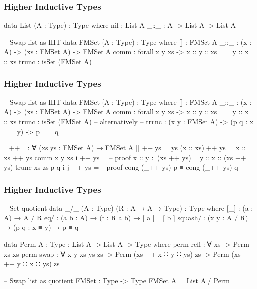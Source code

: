 \documentclass{beamer}
\begin{document}
\begin{frame}[fragile]
\frametitle{Higher Inductive Types}

\begin{code}
data List (A : Type) : Type where
  nil : List A
  _::_ : A -> List A -> List A

-- Swap list as HIT
data FMSet (A : Type) : Type where
  []    : FMSet A
  _::_  : (x : A) -> (xs : FMSet A) -> FMSet A
  comm  : forall x y xs -> x :: y :: xs == y :: x :: xs
  trunc : isSet (FMSet A)
\end{code}

\end{frame}

\begin{frame}[fragile]
\frametitle{Higher Inductive Types}

\begin{code}
-- Swap list as HIT
data FMSet (A : Type) : Type where
  []    : FMSet A
  _::_  : (x : A) -> (xs : FMSet A) -> FMSet A
  comm  : forall x y xs -> x :: y :: xs == y :: x :: xs
  trunc : isSet (FMSet A)
  -- alternatively
  -- trunc : (x y : FMSet A) -> (p q : x == y) -> p == q

_++_ : ∀ (xs ys : FMSet A) → FMSet A
[] ++ ys = ys
(x :: xs) ++ ys = x :: xs ++ ys
comm x y xs i ++ ys =
  -- proof x :: y :: (xs ++ ys) ≡ y :: x :: (xs ++ ys)
trunc xs zs p q i j ++ ys =
  -- proof cong (_++ ys) p ≡ cong (_++ ys) q
\end{code}

\end{frame}

\begin{frame}[fragile]
\frametitle{Higher Inductive Types}

\begin{code}
-- Set quotient
data _/_ (A : Type) (R : A → A → Type) : Type where
  [_] : (a : A) → A / R
  eq/ : (a b : A) → (r : R a b) → [ a ] ≡ [ b ]
  squash/ : (x y : A / R) → (p q : x ≡ y) → p ≡ q

data Perm {A : Type} : List A -> List A -> Type where
  perm-refl : ∀ {xs} -> Perm xs xs
  perm-swap : ∀ {x y xs ys zs}
    -> Perm (xs ++ x ∷ y ∷ ys) zs
    -> Perm (xs ++ y ∷ x ∷ ys) zs

-- Swap list as quotient
FMSet : Type -> Type
FMSet A = List A / Perm
\end{code}

\end{frame}
\end{document}
